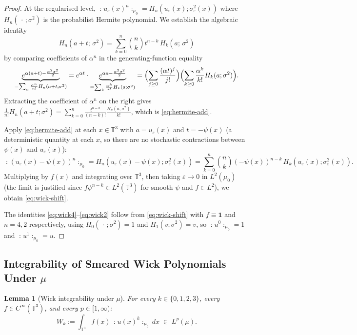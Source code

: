 \documentclass[11pt,a4paper]{article}
\theoremstyle{plain}
\newtheorem{lemma}[theorem]{Lemma}
\theoremstyle{definition}
\newcommand{\T}{\mathbb{T}}
\newcommand{\wick}[1]{\mathopen{:}\!#1\!\mathclose{:}}
\begin{document}
\begin{proof}
At the regularised level, $\wick{u_\varepsilon(x)^n}_{\mu_0}=H_n(u_\varepsilon(x);\sigma_\varepsilon^2(x))$
where $H_n(\,\cdot\,;\sigma^2)$ is the probabilist Hermite polynomial.  We establish
the algebraic identity
\begin{equation}\label{eq:hermite-add}
  H_n(a+t;\,\sigma^2) = \sum_{k=0}^{n}\binom{n}{k}t^{n-k}\,H_k(a;\,\sigma^2)
\end{equation}
by comparing coefficients of $\alpha^n$ in the generating-function equality
\[
  \underbrace{e^{\alpha(a+t)-\frac{\alpha^2\sigma^2}{2}}}_{=\sum_n\frac{\alpha^n}{n!}H_n(a+t;\sigma^2)}
  = e^{\alpha t}\cdot\underbrace{e^{\alpha a - \frac{\alpha^2\sigma^2}{2}}}_{=\sum_k\frac{\alpha^k}{k!}H_k(a;\sigma^2)}
  = \Bigl(\sum_{j\ge0}\frac{(\alpha t)^j}{j!}\Bigr)\Bigl(\sum_{k\ge0}\frac{\alpha^k}{k!}H_k(a;\sigma^2)\Bigr).
\]
Extracting the coefficient of $\alpha^n$ on the right gives
$\frac{1}{n!}H_n(a+t;\sigma^2) = \sum_{k=0}^{n}\frac{t^{n-k}}{(n-k)!}\frac{H_k(a;\sigma^2)}{k!}$,
which is \eqref{eq:hermite-add}.

Apply \eqref{eq:hermite-add} at each $x\in\T^3$ with $a=u_\varepsilon(x)$ and $t=-\psi(x)$
(a deterministic quantity at each $x$, so there are no stochastic contractions between $\psi(x)$
and $u_\varepsilon(x)$):
\[
  \wick{(u_\varepsilon(x)-\psi(x))^n}_{\mu_0}
  = H_n(u_\varepsilon(x)-\psi(x);\sigma_\varepsilon^2(x))
  = \sum_{k=0}^{n}\binom{n}{k}(-\psi(x))^{n-k}\,H_k(u_\varepsilon(x);\sigma_\varepsilon^2(x)).
\]
Multiplying by $f(x)$ and integrating over $\T^3$, then taking $\varepsilon\to0$ in $L^2(\mu_0)$
(the limit is justified since $f\psi^{n-k}\in L^2(\T^3)$ for smooth $\psi$ and $f\in L^2$),
we obtain \eqref{eq:wick-shift}.

The identities \eqref{eq:wick4}--\eqref{eq:wick2} follow from \eqref{eq:wick-shift}
with $f\equiv\mathbf{1}$ and $n=4,2$ respectively, using
$H_0(\,\cdot\,;\sigma^2)=1$ and $H_1(v;\sigma^2)=v$,
so $\wick{u^0}_{\mu_0}=1$ and $\wick{u^1}_{\mu_0}=u$.
\end{proof}

\subsection{Integrability of Smeared Wick Polynomials Under $\mu$}

\begin{lemma}[Wick integrability under $\mu$]\label{lem:integrability}
For every $k\in\{0,1,2,3\}$, every $f\in C^\infty(\T^3)$, and every $p\in[1,\infty)$:
\begin{equation}\label{eq:Lp-bound}
  W_k := \int_{\T^3} f(x)\,\wick{u(x)^k}_{\mu_0}\,dx
  \;\in\; L^p(\mu).
\end{equation}
\end{lemma}
\end{document}
